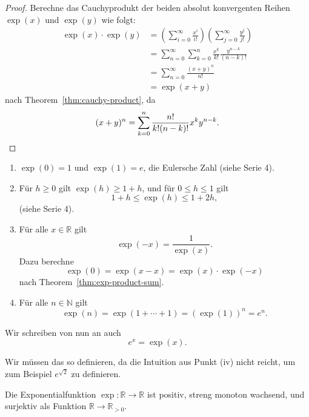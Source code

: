 \documentclass[../main.tex]{subfiles}
\begin{document}
\begin{proof}
  Berechne das Cauchyprodukt
  der beiden absolut konvergenten Reihen
  $\exp(x)$ und $\exp(y)$ wie folgt:
  \begin{align*}
    \exp(x) \cdot \exp(y) & =
    \left(\sum_{i=0}^{\infty} \frac{x^i}{i!}\right)
    \left( \sum_{j=0}^{\infty} \frac{y^j}{j!} \right)\\ &
    = \sum_{n=0}^{\infty} \sum_{k=0}^{n} \frac{x^k}{k!} 
    \frac{y^{n-k}}{(n-k)!} \\ &
    = \sum_{n=0}^{\infty} \frac{(x + y)^n}{n!} \\&
    = \exp(x + y)
  \end{align*}
  nach Theorem~\ref{thm:cauchy-product},
  da
  \[
    (x + y)^n = \sum_{k=0}^{n} \frac{n!}{k!(n-k)!} x^k y^{n-k}.
    \qedhere
  \]
\end{proof}

\begin{eig-exp}
  \leavevmode
  \begin{enumerate}[\normalfont(i)]
    \item $\exp(0) = 1$ und $\exp(1) = e$, die Eulersche Zahl
      (siehe Serie 4).
    \item Für $h \geq 0$ gilt $\exp(h) \geq 1 + h$,
      und für $0 \leq h \leq 1$ gilt  
      \[
        1 + h \leq \exp(h) \leq 1 + 2h,
      \]
      (siehe Serie 4). %
    \item Für alle $x \in \mathbb{R}$ gilt
      \[
        \exp(-x) = \frac{1}{\exp(x)}.
      \]
      Dazu berechne
      \[
        \exp(0) = \exp(x - x) = \exp(x) \cdot \exp(-x)
      \]
      nach Theorem~\ref{thm:exp-product-sum}.
    \item Für alle
      $n \in \mathbb{N}$ gilt
      \[
        \exp(n) = \exp(1 + \cdots + 1) =
        \left( \exp(1) \right)^n = e^n.
      \]
  \end{enumerate}
\end{eig-exp}

\begin{notation}
  Wir schreiben von nun an auch
  \[
    e^x = \exp(x).
  \]
\end{notation}

Wir müssen das so 
definieren, da die Intuition aus
Punkt (iv) nicht reicht, um zum Beispiel
$e^{\sqrt 2}$ zu definieren.

\begin{proposition*}
  Die Exponentialfunktion $\exp \colon \mathbb{R} \to \mathbb{R}$ 
  ist positiv, streng monoton wachsend, und surjektiv
  als Funktion $\mathbb{R} \to \mathbb{R}_{>0}$.
\end{proposition*}
\end{document}
